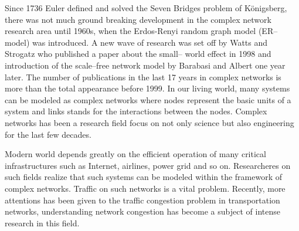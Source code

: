 \documentclass[onecolumn,preprintnumbers,amsmath,amssymb]{revtex4}
\begin{document}
Since 1736 Euler defined and solved the Seven Bridges problem of Königsberg, there was not much ground breaking development in the complex network research area until 1960s, when the Erdos-Renyi random graph model (ER–model) was introduced. A new wave of research was set off by Watts and Strogatz who published a paper about the small– world effect in 1998 and introduction of the scale–free network model by Barabasi and Albert one year later. The number of publications in the last 17 years in complex networks is more than the total appearance before 1999. In our living world, many systems can be modeled as complex networks where nodes represent the basic units of a system and links stands for the interactions between the nodes\cite{TFWN}. Complex networks has been a research field focus on not only science but also engineering for the last few decades\cite{PSV,AEM,KIG,BTS,LZYC,HHM,RAA,SND,MEJ,SBV}.


Modern world depends greatly on the efficient operation of many critical infrastructures such as Internet, airlines, power grid and so on\cite{TCIC}. Researcheres on such fields realize that such systems can be modeled within the framework of complex networks. Traffic on such networks is a vital problem. Recently, more attentions has been given to the traffic congestion problem in transportation networks, understanding network congestion has become a subject of intense research in this field. 
\end{document}
